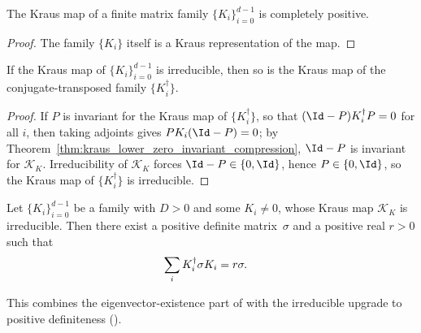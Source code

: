 \begin{theorem}%
    \label{thm:kraus_map_cp}
    \leanok
    The Kraus map of a finite matrix family $\{K_i\}_{i=0}^{d-1}$ is
    completely positive.
\end{theorem}

\begin{proof}\leanok
    The family $\{K_i\}$ itself is a Kraus representation of the map.
\end{proof}

\begin{theorem}%
    \label{thm:kraus_conjTranspose_irreducible}
    \leanok
    If the Kraus map of $\{K_i\}_{i=0}^{d-1}$ is irreducible, then so is the
    Kraus map of the conjugate-transposed family $\{K_i^\dagger\}$.
\end{theorem}

\begin{proof}\leanok
    If $P$ is invariant for the Kraus map of $\{K_i^\dagger\}$, so that
    $(\Id-P)K_i^\dagger P=0$ for all $i$, then taking adjoints gives
    $PK_i(\Id-P)=0$; by
    Theorem~\ref{thm:kraus_lower_zero_invariant_compression}, $\Id-P$ is
    invariant for $\mathcal K_K$.
    Irreducibility of $\mathcal K_K$ forces $\Id-P \in \{0,\Id\}$, hence
    $P \in \{0,\Id\}$, so the Kraus map of $\{K_i^\dagger\}$ is irreducible.
\end{proof}

\begin{theorem}%
    \label{thm:kraus_posdef_adjoint_eigenvector}
    \leanok
    Let $\{K_i\}_{i=0}^{d-1}$ be a family with $D > 0$ and some
    $K_i \neq 0$, whose Kraus map $\mathcal K_K$ is irreducible. Then there
    exist a positive definite matrix~$\sigma$ and a positive real $r > 0$
    such that
    \begin{align}
        \sum_i K_i^\dagger \sigma K_i
         & = r\sigma.
        \notag
    \end{align}

    This combines the eigenvector-existence part of
    \cite[Theorem~6.5]{Wolf2012Quantum} with the irreducible upgrade to
    positive definiteness (\cite[Theorem~6.3(2)]{Wolf2012Quantum}).
\end{theorem}

